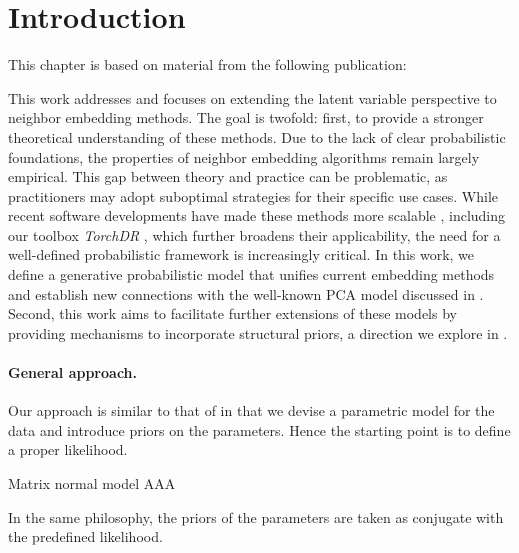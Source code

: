 \section{Introduction}\label{intro}


This chapter is based on material from the following publication:

\begin{mdframed}
\begin{center} 
\end{center}
\end{mdframed}


This work addresses  and focuses on extending the latent variable perspective to neighbor embedding methods. The goal is twofold: first, to provide a stronger theoretical understanding of these methods. Due to the lack of clear probabilistic foundations, the properties of neighbor embedding algorithms remain largely empirical. This gap between theory and practice can be problematic, as practitioners may adopt suboptimal strategies for their specific use cases.  
While recent software developments have made these methods more scalable \citep{chan2018t,pezzotti2019gpgpu,linderman2019fast}, including our toolbox \emph{TorchDR} \citep{vanassel2024torchdr}, which further broadens their applicability, the need for a well-defined probabilistic framework is increasingly critical.  
In this work, we define a generative probabilistic model that unifies current embedding methods and establish new connections with the well-known PCA model discussed in .  
Second, this work aims to facilitate further extensions of these models by providing mechanisms to incorporate structural priors, a direction we explore in .

\paragraph{General approach.}
Our approach is similar to that of  in that we devise a parametric model for the data and introduce priors on the parameters. Hence the starting point is to define a proper likelihood. 

\begin{mem1}{Matrix normal model}\label{memo:matrix_normal}
    AAA
\end{mem1}

In the same philosophy,  the priors of the parameters are taken as conjugate with the predefined likelihood. 

